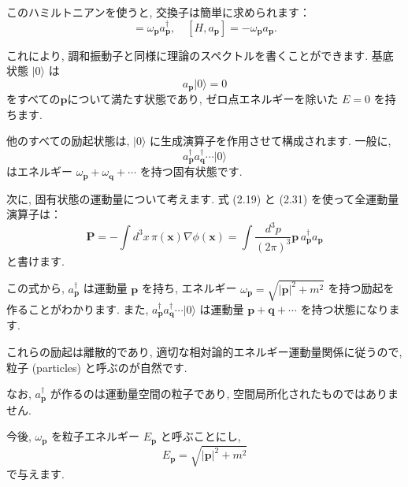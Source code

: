 \documentclass[a4paper,12pt]{article}
\begin{document}
このハミルトニアンを使うと, 交換子は簡単に求められます：
\begin{equation*}
[H, a^\dagger_{\mathbf{p}}] = \omega_{\mathbf{p}} a^\dagger_{\mathbf{p}} , \quad
[H, a_{\mathbf{p}}] = -\omega_{\mathbf{p}} a_{\mathbf{p}} .
\end{equation*}

これにより, 調和振動子と同様に理論のスペクトルを書くことができます.  
基底状態 $\lvert 0 \rangle$ は
\begin{equation*}
a_{\mathbf{p}} \lvert 0 \rangle = 0
\end{equation*}
をすべての$\mathbf{p}$について満たす状態であり, ゼロ点エネルギーを除いた $E=0$ を持ちます.

他のすべての励起状態は, $\lvert 0 \rangle$ に生成演算子を作用させて構成されます.  
一般に,
\begin{equation*}
a^\dagger_{\mathbf{p}} a^\dagger_{\mathbf{q}} \cdots \lvert 0 \rangle
\end{equation*}
はエネルギー $\omega_{\mathbf{p}} + \omega_{\mathbf{q}} + \cdots$ を持つ固有状態です.

\vspace{0.5em}

次に, 固有状態の運動量について考えます.  
式 (2.19) と (2.31) を使って全運動量演算子は：
\begin{equation*}
\mathbf{P} = -\int d^3x\, \pi(\mathbf{x}) \nabla \phi(\mathbf{x})
= \int \frac{d^3p}{(2\pi)^3} \mathbf{p} \, a^\dagger_{\mathbf{p}} a_{\mathbf{p}}
\end{equation*}
と書けます.

\vspace{0.5em}

この式から,
$a^\dagger_{\mathbf{p}}$ は運動量 $\mathbf{p}$ を持ち, エネルギー $\omega_{\mathbf{p}} = \sqrt{|\mathbf{p}|^2 + m^2}$ を持つ励起を作ることがわかります.  
また,
$a^\dagger_{\mathbf{p}} a^\dagger_{\mathbf{q}} \cdots \lvert 0 \rangle$
は運動量 $\mathbf{p} + \mathbf{q} + \cdots$ を持つ状態になります.

\vspace{0.5em}

これらの励起は離散的であり, 適切な相対論的エネルギー運動量関係に従うので,
粒子 (particles) と呼ぶのが自然です.

なお, $a^\dagger_{\mathbf{p}}$ が作るのは運動量空間の粒子であり, 空間局所化されたものではありません.

\vspace{0.5em}

今後, $\omega_{\mathbf{p}}$ を粒子エネルギー $E_{\mathbf{p}}$ と呼ぶことにし,
\begin{equation*}
E_{\mathbf{p}} = \sqrt{|\mathbf{p}|^2 + m^2}
\end{equation*}
で与えます.
\end{document}
